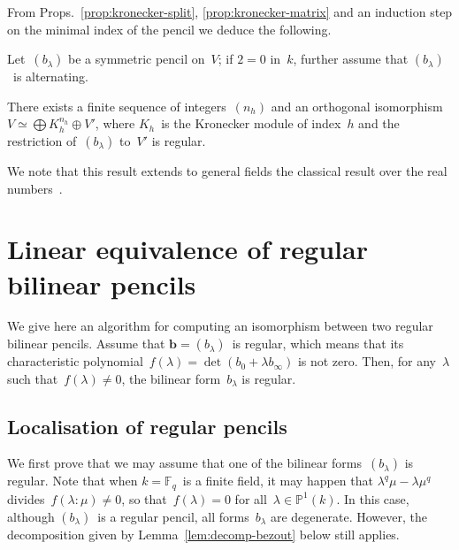 \documentclass{article}%
\def\F{\mathbb{F}}
\begin{document}
From Props.~\ref{prop:kronecker-split}, \ref{prop:kronecker-matrix} and
an induction step on the minimal index of the pencil we deduce the
following.

\begin{prop}\label{prop:kronecker}%
Let~$(b_{λ})$ be a symmetric pencil on~$V$; if $2 = 0$ in~$k$, further
assume that $(b_{λ})$~is alternating.

There exists a finite sequence of integers~$(n_h)$ and 
an orthogonal isomorphism~$V ≃ ⨁ K_h^{n_h} ⊕ V'$,
where $K_h$~is the Kronecker module of index~$h$
and the restriction of~$(b_{λ})$ to~$V'$ is regular.
\end{prop}

We note that this result extends to general fields
the classical result over the real numbers~\cite[XII, §4]{Gantmacher}.
\section{Linear equivalence of regular bilinear pencils}%
\label{S:bil-regular}

We give here an algorithm for computing an isomorphism between two
regular bilinear pencils. Assume that $\bm{b} = (b_{λ})$~is regular,
which means that its characteristic polynomial~$f(λ) = \det (b_0 + λ
b_{∞})$ is not zero. Then, for any~$λ$ such that~$f(λ) ≠ 0$, the bilinear
form~$b_{λ}$ is regular.

\subsection{Localisation of regular pencils}%
\label{SS:bil-reg-local}

We first prove that we may assume that one of the bilinear
forms~$(b_{λ})$ is regular.
Note that when $k = \F_q$~is a finite field, it may happen that $λ^q μ -
λ μ^q$ divides~$f(λ:μ) ≠ 0$, so that~$f(λ) = 0$ for all~$λ ∈ ℙ^1(k)$. In
this case, although $(b_{λ})$~is a regular pencil, all forms~$b_{λ}$ are
degenerate. However, the decomposition given by
Lemma~\ref{lem:decomp-bezout} below still applies.
\end{document}
